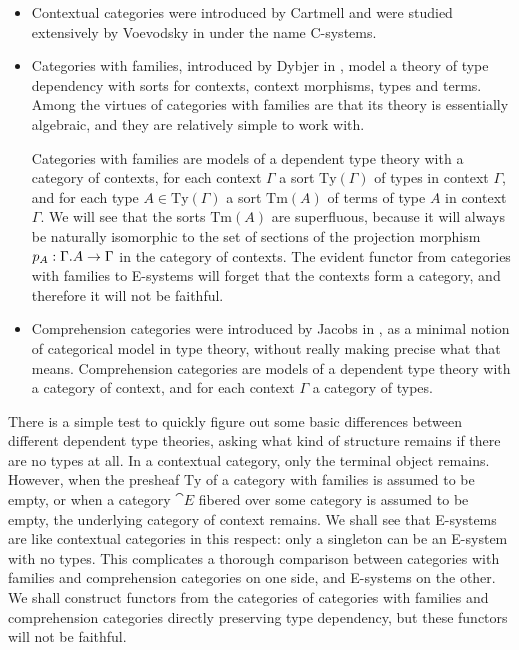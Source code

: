 \documentclass{article}
\begin{document}
\begin{itemize}
\item Contextual categories were introduced by Cartmell \cite{Cartmell1986} and were studied
extensively by Voevodsky in \cite{VV_Csys_univ,VV_C-systems_monad,VV_C-systems_quotients}
under the name C-systems.
\item Categories with families, introduced by Dybjer in \cite{Dybjer1996}, model a
theory of type dependency with sorts for contexts, context morphisms, types
and terms. Among the virtues of categories with families are that its theory
is essentially algebraic, and they are relatively simple to work with.

Categories with families are models of a dependent type theory with a
category of contexts, for each context $\Gamma$ a sort $\mathrm{Ty}(\Gamma)$ of
types in context $\Gamma$, and for each type $A\in\mathrm{Ty}(\Gamma)$ a sort
$\mathrm{Tm}(A)$ of terms of type $A$ in context $\Gamma$. We will see that
the sorts $\mathrm{Tm}(A)$ are superfluous, because it will always be 
naturally isomorphic to the set of sections of the projection morphism
$p_A:\ctxext{\Gamma}{A}\to\Gamma$ in the category of contexts. The evident
functor from categories with families to E-systems will forget that the contexts
form a category, and therefore it will not be faithful.
\item Comprehension categories were introduced by Jacobs in \cite{Jacobs1993}, as
a minimal notion of categorical model in type theory, without really making
precise what that means. 
Comprehension categories are models of a dependent type theory with a
category of context, and for each context $\Gamma$ a category of types. 
\end{itemize}

There is a simple test to quickly figure out some basic differences between different
dependent type theories, asking what kind of structure remains if there are no
types at all. In a contextual category, only the terminal object remains.
However, when the presheaf $\mathrm{Ty}$ of a category with families is assumed
to be empty, or when a category $\cat{E}$ fibered over some category is assumed
to be empty, the underlying category of context remains. We shall see that
E-systems are like contextual categories in this respect: only a singleton can
be an E-system with no types. This complicates a thorough comparison between
categories with families and comprehension categories on one side, and E-systems
on the other. We shall construct functors from the categories of categories with
families and comprehension categories directly preserving type dependency, but
these functors will not be faithful. 
\end{document}
